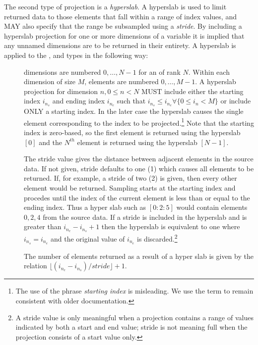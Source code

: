 \documentclass[justify]{nasa-ese}
\renewcommand{\new}[1]{\emph{#1}}
\begin{document}
The second type of projection is a \new{hyperslab}. A hyperslab is
used to limit returned data to those elements that fall within a range
of index values, and MAY also specify that the range be subsampled
using a \new{stride}. By including a hyperslab projection for one or
more dimensions of a variable it is implied that any unnamed
dimensions are to be returned in their entirety. A hyperslab is
applied to the \Array, \Grid and \Sequence types in the following way:
\begin{description}
  \item[\Array] \Array dimensions are numbered $0, \ldots, N-1$ for an
    \Array of rank $N$. Within each dimension of size $M$, elements
    are numbered $0, \ldots, M-1$. A hyperslab projection for
    dimension $n, 0 \leq n < N$ MUST include either the starting index
    $i_{n_{s}}$ and ending index $i_{n_{e}}$ such that $i_{n_{s}} \leq
    i_{n_{e}} \forall \{ 0 \leq i_{n} < M \}$ or include ONLY a
    starting index. In the later case the hyperslab causes the single
    element corresponding to the index to be projected.\footnote{The
      use of the phrase {\it starting index} is misleading. We use
      the term to remain consistent with older documentation.} Note
    that the starting index is zero-based, so the first element is
    returned using the hyperslab $[0]$ and the $N^{th}$ element is
    returned using the hyperslab $[N-1]$. 

    The stride value gives the distance between adjacent elements in
    the source data. If not given, stride defaults to one (1) which
    causes all elements to be returned. If, for example, a stride of
    two (2) is given, then every other element would be returned.
    Sampling starts at the starting index and procedes until the index of
    the current element is less than or equal to the ending index.
    Thus a hyper slab such as $[0:2:5]$ would contain elements $0, 2,
    4$ from the source data. If a stride is included in the hyperslab
    and is greater than $i_{n_{e}} - i_{n_{s}} + 1$ then the hyperslab
    is equivalent to one where $i_{n_{s}} = i_{n_{e}}$ and the
    original value of $i_{n_{e}}$ is discarded.\footnote{A stride
      value is only meaningful when a projection contains a range of
      values indicated by both a start and end value; stride is not
      meaning full when the projection consists of a start value
      only.}

    The number of elements returned as a result of a hyper slab is
    given by the relation 
    $\lfloor ( i_{n_{e}} - i_{n_{s}} ) / stride \rfloor + 1$.


\end{description}
\end{document}
